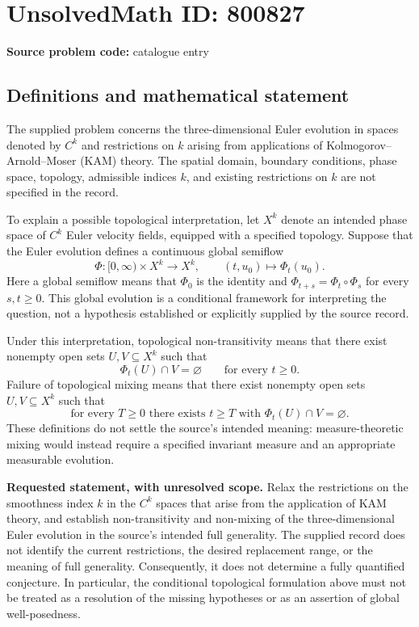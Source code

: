 \documentclass[11pt]{article}
\begin{document}
\section*{UnsolvedMath ID: 800827}
\textbf{Source problem code:} catalogue entry
\subsection{Definitions and mathematical statement}
The supplied problem concerns the three-dimensional Euler evolution in spaces denoted by $C^k$ and restrictions on $k$ arising from applications of Kolmogorov--Arnold--Moser (KAM) theory. The spatial domain, boundary conditions, phase space, topology, admissible indices $k$, and existing restrictions on $k$ are not specified in the record.

To explain a possible topological interpretation, let $X^k$ denote an intended phase space of $C^k$ Euler velocity fields, equipped with a specified topology. Suppose that the Euler evolution defines a continuous global semiflow
\[
\Phi\colon [0,\infty)\times X^k\longrightarrow X^k,
\qquad (t,u_0)\longmapsto\Phi_t(u_0).
\]
Here a global semiflow means that $\Phi_0$ is the identity and $\Phi_{t+s}=\Phi_t\circ\Phi_s$ for every $s,t\geq0$. This global evolution is a conditional framework for interpreting the question, not a hypothesis established or explicitly supplied by the source record.

Under this interpretation, topological non-transitivity means that there exist nonempty open sets $U,V\subseteq X^k$ such that
\[
\Phi_t(U)\cap V=\varnothing
\qquad\text{for every }t\geq0.
\]
Failure of topological mixing means that there exist nonempty open sets $U,V\subseteq X^k$ such that
\[
\text{for every }T\geq0\text{ there exists }t\geq T
\text{ with }\Phi_t(U)\cap V=\varnothing.
\]
These definitions do not settle the source's intended meaning: measure-theoretic mixing would instead require a specified invariant measure and an appropriate measurable evolution.

\textbf{Requested statement, with unresolved scope.} Relax the restrictions on the smoothness index $k$ in the $C^k$ spaces that arise from the application of KAM theory, and establish non-transitivity and non-mixing of the three-dimensional Euler evolution in the source's intended full generality. The supplied record does not identify the current restrictions, the desired replacement range, or the meaning of full generality. Consequently, it does not determine a fully quantified conjecture. In particular, the conditional topological formulation above must not be treated as a resolution of the missing hypotheses or as an assertion of global well-posedness.
\end{document}
